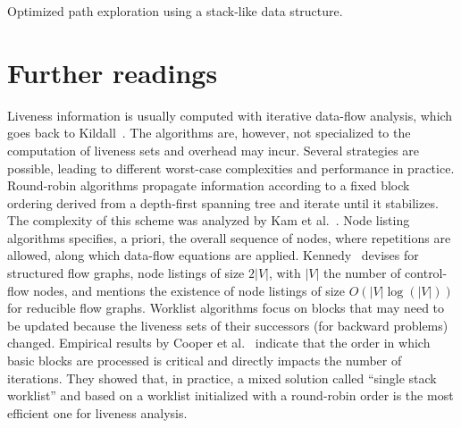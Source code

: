 \begin{algorithm}[h]
  \caption{Optimized path exploration using a stack-like data structure.}
  \label{alg:up_and_mark_stack}
\end{algorithm}




\section{Further readings}
\label{sec:liveness:further}
Liveness information is usually computed with iterative
data-flow analysis, which goes back to Kildall~\cite{Kildall}. The algorithms are,
however, not specialized to the computation of liveness sets and overhead may
incur. Several strategies are possible, leading to
different worst-case complexities and performance in practice. Round-robin algorithms
propagate information according to a fixed block ordering derived from a
depth-first spanning tree and iterate until it stabilizes.  The complexity of
this scheme was analyzed by Kam et al.~\cite{novillo:bib:KU76}.  
Node listing algorithms specifies, a priori, the overall sequence of nodes, where repetitions are allowed, along which data-flow equations are applied.
Kennedy~\cite{Kennedy75} devises for structured flow graphs, node listings of size $2|V|$, with $|V|$ the number of control-flow nodes, and mentions the existence of node listings of size $O\left(|V| \log(|V|)\right)$ for reducible flow graphs.
Worklist algorithms focus on blocks that may need
to be updated because the liveness sets of their successors (for
backward problems) changed.
Empirical results by Cooper et al.~\cite{CHK06} indicate that the order in
which basic blocks are processed is critical and directly impacts the number of
iterations. They showed that, in practice, a mixed solution called ``single
stack worklist'' and based on a worklist initialized with a round-robin order is
the most efficient one  for liveness analysis. 

